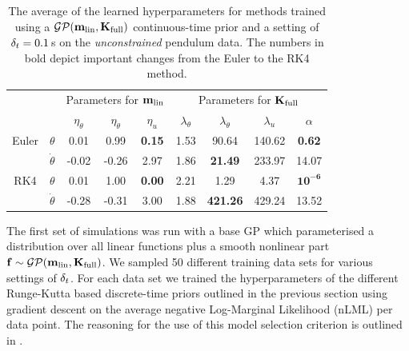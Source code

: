 \begin{table}[t]
\renewcommand{\arraystretch}{1.3}
\begin{center}
\small
\begin{tabular}{ cc | ccc | ccc | c }
\toprule[1.5pt] 
&& \multicolumn{3}{c|}{Parameters for $\mathbf{m}_{\text{lin}}$}
& \multicolumn{4}{c}{Parameters for $\mathbf{K}_{\text{full}}$} \\
&& $\eta_{\theta}$ & $\eta_{\dot\theta}$ & $\eta_{u}$ 
& $\lambda_{\theta}$ & $\lambda_{\dot\theta}$ & \multicolumn{1}{c}{ $\lambda_{u}$ } & $\alpha$ \\
\hline
%
Euler & $\theta$ &
0.01 & 0.99 & {\bf0.15} & 1.53 & 90.64 & 140.62 & {\bf0.62} \\
 & $\dot\theta$ &
-0.02 & -0.26 & 2.97 & 1.86 & {\bf21.49} & 233.97 & 14.07 \\
\hline
%
RK4 & $\theta$ &
0.01 & 1.00 & {\bf0.00} & 2.21 & 1.29 & 4.37  &    {$\mathbf{10^{-6}}$} \\
 & $\dot\theta$ &
-0.28 & -0.31 & 3.00 & 1.88 & {\bf421.26} & 429.24 & 13.52 \\
\bottomrule[1.5pt]
\end{tabular}
\end{center}
\caption{The average of the learned hyperparameters for methods trained using a $\mathcal{GP}(\mathbf{m}_{\text{lin}},\mathbf{K}_{\text{full}})$ continuous-time prior and a setting of $\delta_t=0.1\,$s on the \textit{unconstrained} pendulum data. The numbers in bold depict important changes from the Euler to the RK4 method.}
\label{tab:hyps_dt01}
\end{table}



The first set of simulations was run with a base GP which parameterised a distribution over all linear functions plus a smooth nonlinear part $\mathbf{f} \sim \mathcal{GP}(\mathbf{m}_{\text{lin}},\mathbf{K}_{\text{full}})$. We sampled 50 different training data sets for various settings of $\delta_t$. For each data set we trained the hyperparameters of the different Runge-Kutta based discrete-time priors outlined in the previous section using gradient descent on the average negative Log-Marginal Likelihood (nLML) per data point. The reasoning for the use of this model selection criterion is outlined in . 

